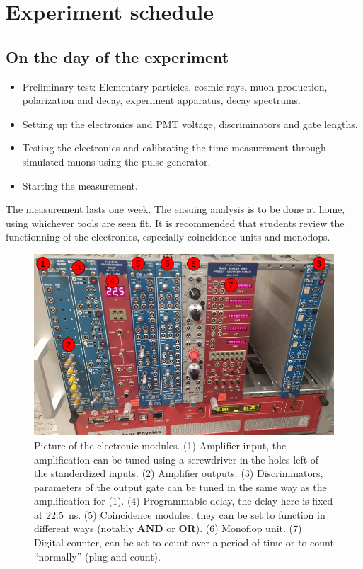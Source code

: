 \chapter*{Experiment schedule}

\section{On the day of the experiment}

\begin{itemize}

\item Preliminary test: Elementary particles, cosmic rays, muon production, polarization and decay, experiment apparatus, decay spectrums.

\item Setting up the electronics and PMT voltage, discriminators and gate lengths.

\item Testing the electronics and calibrating the time measurement through simulated muons using the pulse generator.

\item Starting the measurement.
\end{itemize}

The measurement lasts one week. The ensuing analysis is to be done at home, using whichever tools are seen fit. It is recommended that students review the functionning of the electronics, especially coincidence units and monoflops.

\begin{figure}
\centering
\includegraphics[width=\linewidth]{./fig/pic.png}
\caption{Picture of the electronic modules. (1) Amplifier input, the amplification can be tuned using a screwdriver in the holes left of the standerdized inputs. (2) Amplifier outputs. (3) Discriminators, parameters of the output gate can be tuned in the same way as the amplification for (1). (4) Programmable delay, the delay here is fixed at \SI{22.5}{\nano\second}. (5) Coincidence modules, they can be set to function in different ways (notably \textbf{AND} or \textbf{OR}). (6) Monoflop unit. (7) Digital counter, can be set to count over a period of time or to count ``normally'' (plug and count).}
\end{figure}
